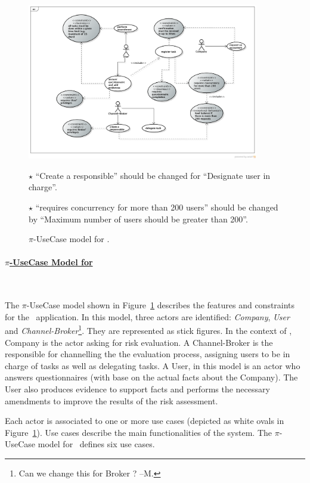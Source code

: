 \begin{figure}[t]
\centering
\includegraphics[width=0.9\textwidth]{figs/UseCaseGeneral.png}

{\color{red} \raggedright
$\star$ ``Create a responsible'' should be changed for ``Designate user in charge''.

$\star$ ``requires concurrency for more than 200 users'' should be changed by ``Maximum number of users should be greater than 200''.
}
\caption{$\pi$-UseCase model for \FlyingPig.\label{fig:piUseCaseModel}}
\end{figure}


\paragraph{\underline{$\pi$-UseCase Model for \FlyingPig}}~

The $\pi$-UseCase model shown in Figure~\ref{fig:piUseCaseModel} describes the features and constraints for the \FlyingPig\ application. 
In this model, three actors are identified: \textit{Company}, \textit{User} and \textit{Channel-Broker}\footnote{\color{red} Can we change this for Broker ? --M.}. 
They are represented as stick figures.
In the context of \FlyingPig, Company is the actor asking for risk evaluation.
A Channel-Broker is the responsible for channelling the the evaluation process, assigning users to be in charge of tasks as well as delegating tasks. 
A User, in this model is an actor who answers questionnaires (with base on the actual facts about the Company).
The User also produces evidence to support facts and performs the necessary amendments to improve the results of the risk assessment.

Each actor is associated to one or more use cases (depicted as white ovals in Figure~\ref{fig:piUseCaseModel}). 
Use cases describe the main functionalities of the system.
The $\pi$-UseCase model for \FlyingPig\ defines six use cases. 

